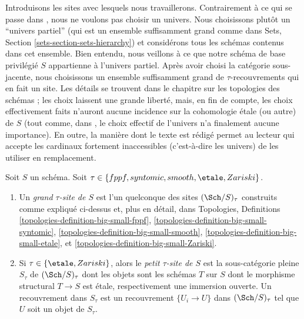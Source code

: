 \medskip\noindent
Introduisons les sites avec lesquels nous travaillerons.
Contrairement \`a ce qui se passe dans
\cite{SGA4}, nous ne voulons pas choisir un univers. Nous choisissons plut\^ot un ``univers
partiel'' (qui est un ensemble suffisamment grand comme dans
Sets, Section \ref{sets-section-sets-hierarchy}) et consid\'erons tous les sch\'emas
contenus dans cet ensemble. Bien entendu, nous veillons \`a ce que notre sch\'ema de base privil\'egi\'e
$S$ appartienne \`a l'univers partiel. Apr\`es avoir choisi la cat\'egorie sous-jacente,
nous choisissons un ensemble suffisamment grand de $\tau$-recouvrements qui en fait un site.
Les d\'etails se trouvent dans le chapitre sur les topologies des sch\'emas ; les choix
laissent une grande libert\'e, mais, en fin de compte, les choix effectivement faits n'auront
aucune incidence sur la cohomologie \'etale (ou autre) de $S$ (tout comme, dans \cite{SGA4},
le choix effectif de l'univers n'a finalement aucune importance). En outre, la mani\`ere dont le
texte est r\'edig\'e permet au lecteur qui accepte les cardinaux fortement inaccessibles
(c'est-\`a-dire les univers) de les utiliser en remplacement.

\begin{definition}
\label{definition-tau-site}
Soit $S$ un sch\'ema.
Soit $\tau \in \{fppf, syntomic, smooth, \etale, \linebreak[0] Zariski\}$.
\begin{enumerate}
\item Un {\it grand $\tau$-site de $S$} est l'un quelconque des sites
$(\Sch/S)_\tau$ construits comme expliqu\'e ci-dessus et, plus en d\'etail, dans
Topologies, Definitions
\ref{topologies-definition-big-small-fppf},
\ref{topologies-definition-big-small-syntomic},
\ref{topologies-definition-big-small-smooth},
\ref{topologies-definition-big-small-etale}, et
\ref{topologies-definition-big-small-Zariski}.
\item Si $\tau \in \{\etale, Zariski\}$, alors le
{\it petit $\tau$-site de $S$}
est la sous-cat\'egorie pleine $S_\tau$ de $(\Sch/S)_\tau$ dont les objets
sont les sch\'emas $T$ sur $S$ dont le morphisme structural $T \to S$ est \'etale,
respectivement une immersion ouverte. Un recouvrement dans $S_\tau$ est un recouvrement
$\{U_i \to U\}$ dans $(\Sch/S)_\tau$
tel que $U$ soit un objet de $S_\tau$.
\end{enumerate}
\end{definition}

